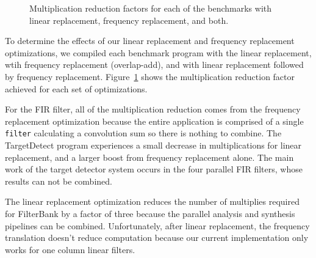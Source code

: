 

\begin{figure}
\center
\epsfxsize=3.2in
\vspace{-6pt}
\caption{Multiplication reduction factors for each of the benchmarks with linear replacement, frequency replacement, and both.}
\label{fig:linear-freq-both}
\vspace{-12pt}
\end{figure}

To determine the effects of our linear replacement and frequency replacement 
optimizations, we compiled each benchmark program with the linear 
replacement, wtih frequency replacement (overlap-add),
and with linear replacement followed by frequency replacement. 
Figure~\ref{fig:linear-freq-both} shows the multiplication reduction factor 
achieved for each set of optimizations.

For the FIR filter, all of the multiplication reduction comes from the frequency
replacement optimization because the entire application is comprised of a single
{\tt filter} calculating a convolution sum so there is nothing to combine.
The TargetDetect program experiences a small decrease in multiplications 
for linear replacement, and a larger boost from frequency replacement alone.
The main work of the target detector system occurs in the four parallel FIR filters, whose
results can not be combined.

The linear replacement optimization reduces the number of multiplies 
required for FilterBank by a factor of three because the parallel analysis and 
synthesis pipelines can be combined. Unfortunately, after
linear replacement, the frequency translation doesn't reduce computation 
because our current implementation only works for one column linear filters.

